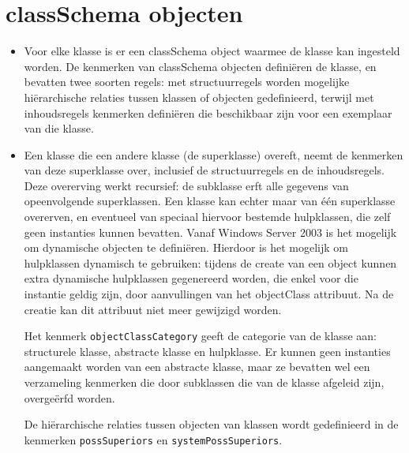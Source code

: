 	\section{classSchema objecten }
	\begin{enumerate}
		 { 
			\begin{itemize}
				\item Voor elke klasse is er een classSchema object waarmee de klasse kan ingesteld worden. De kenmerken van classSchema objecten definiëren de klasse, en bevatten twee soorten regels: met structuurregels worden mogelijke hiërarchische relaties tussen klassen of objecten gedefinieerd, terwijl met inhoudsregels kenmerken definiëren die beschikbaar zijn voor een exemplaar van die klasse.
			\end{itemize}	
		}
		
		 {
			\begin{itemize}
				\item Een klasse die een andere klasse (de superklasse) overeft, neemt de kenmerken van deze superklasse over, inclusief de structuurregels en de inhoudsregels. Deze overerving werkt recursief: de subklasse erft alle gegevens van opeenvolgende superklassen. Een klasse kan echter maar van één superklasse overerven, en eventueel van speciaal hiervoor bestemde hulpklassen, die zelf geen instanties kunnen bevatten. Vanaf Windows Server 2003 is het mogelijk om dynamische objecten te definiëren. Hierdoor is het mogelijk om hulpklassen dynamisch te gebruiken: tijdens de create van een object kunnen extra dynamische hulpklassen gegenereerd worden, die enkel voor die instantie geldig zijn, door aanvullingen van het objectClass attribuut. Na de creatie kan dit attribuut niet meer gewijzigd worden.

				Het kenmerk \texttt{objectClassCategory} geeft de categorie van de klasse aan: structurele klasse, abstracte klasse en hulpklasse. Er kunnen geen instanties aangemaakt worden van een abstracte klasse, maar ze bevatten wel een verzameling kenmerken die door subklassen die van de klasse afgeleid zijn, overgeërfd worden. 

				De hiërarchische relaties tussen objecten van klassen wordt gedefinieerd in de kenmerken \texttt{possSuperiors} en \texttt{systemPossSuperiors}. 
			\end{itemize}	
		}
		

\end{enumerate}
